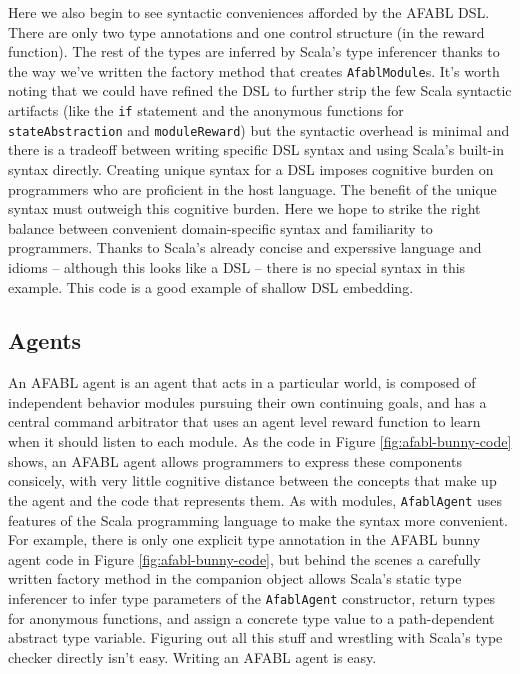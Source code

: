 Here we also begin to see syntactic conveniences afforded by the AFABL DSL. There are only two type annotations and one control structure (in the reward function). The rest of the types are inferred by Scala's type inferencer thanks to the way we've written the factory method that creates {\tt AfablModule}s. It's worth noting that we could have refined the DSL to further strip the few Scala syntactic artifacts (like the {\tt if} statement and the anonymous functions for {\tt stateAbstraction} and {\tt moduleReward}) but the syntactic overhead is minimal and there is a tradeoff between writing specific DSL syntax and using Scala's built-in syntax directly. Creating unique syntax for a DSL imposes cognitive burden on programmers who are proficient in the host language. The benefit of the unique syntax must outweigh this cognitive burden. Here we hope to strike the right balance between convenient domain-specific syntax and familiarity to programmers. Thanks to Scala's already concise and experssive language and idioms -- although this looks like a DSL -- there is no special syntax in this example. This code is a good example of shallow DSL embedding.

\subsection{Agents}

An AFABL agent is an agent that acts in a particular world, is composed of independent behavior modules pursuing their own continuing goals, and has a central command arbitrator that uses an agent level reward function to learn when it should listen to each module. As the code in Figure \ref{fig:afabl-bunny-code} shows, an AFABL agent allows programmers to express these components consicely, with very little cognitive distance between the concepts that make up the agent and the code that represents them. As with modules, {\tt AfablAgent} uses features of the Scala programming language to make the syntax more convenient. For example, there is only one explicit type annotation in the AFABL bunny agent code in Figure \ref{fig:afabl-bunny-code}, but behind the scenes a carefully written factory method in the companion object allows Scala's static type inferencer to infer type parameters of the {\tt AfablAgent} constructor, return types for anonymous functions, and assign a concrete type value to a path-dependent abstract type variable. Figuring out all this stuff and wrestling with Scala's type checker directly isn't easy. Writing an AFABL agent is easy.

